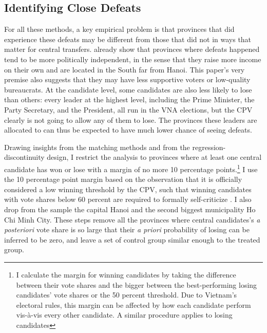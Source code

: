 \documentclass[12pt]{article}
\newcommand{\1}{\mathbbm{1}}
\begin{document}
\subsection{Identifying Close Defeats}
\label{sec:methods_sample}

For all these methods, a key empirical problem is that provinces that did experience these defeats may be different from those that did not in ways that matter for central transfers. \citet{MaleskySchuler2011} already show that provinces where defeats happened tend to be more politically independent, in the sense that they raise more income on their own and are located in the South far from Hanoi. This paper's very premise also suggests that they may have less supportive voters or low-quality bureaucrats. At the candidate level, some candidates are also less likely to lose than others: every leader at the highest level, including the Prime Minister, the Party Secretary, and the President, all run in the VNA elections, but the CPV clearly is not going to allow any of them to lose. The provinces these leaders are allocated to can thus be expected to have much lower chance of seeing defeats. 

Drawing insights from the matching methods and from the regression-discontinuity design, I restrict the analysis to provinces where at least one central candidate has won or lose with a margin of no more 10 percentage points.\footnote{I calculate the margin for winning candidates by taking the difference between their vote shares and the bigger between the best-performing losing candidates' vote shares or the 50 percent threshold. Due to Vietnam's electoral rules, this margin can be affected by how each candidate perform vis-\`{a}-vis every other candidate. A similar procedure applies to losing candidates} I use the 10 percentage point margin based on the observation that it is officially considered a low winning threshold by the CPV, such that winning candidates with vote shares below 60 percent are required to formally self-criticize \citep{MaleskySchuler2011}. I also drop from the sample the capital Hanoi and the second biggest municipality Ho Chi Minh City. These steps remove all the provinces where central candidates's \textit{a posteriori} vote share is so large that their \textit{a priori} probability of losing can be inferred to be zero, and leave a set of control group similar enough to the treated group.
\end{document}
